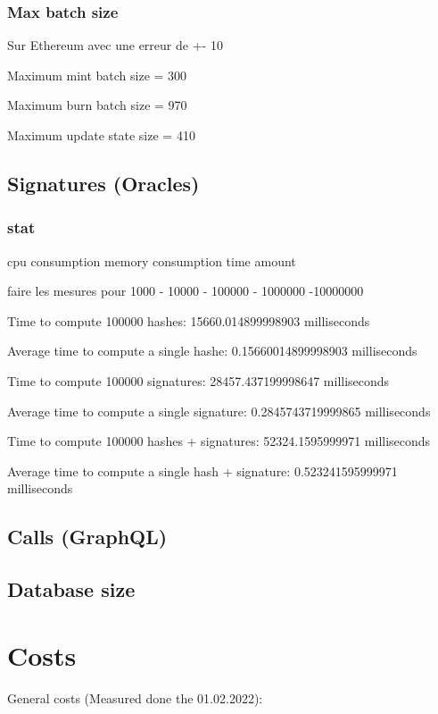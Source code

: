\documentclass[a4paper,11pt,oneside]{report}
\begin{document}
\subsubsection{Max batch size}
Sur Ethereum avec une erreur de +- 10 

Maximum mint batch size = 300 

Maximum burn batch size = 970

Maximum update state size = 410

\subsection{Signatures (Oracles)}

\subsubsection{stat}
cpu consumption
memory consumption
time amount



faire les mesures pour 1000 - 10000 - 100000 - 1000000 -10000000



Time to compute 100000 hashes: 15660.014899998903 milliseconds

Average time to compute a single hashe: 0.15660014899998903 milliseconds

Time to compute 100000 signatures: 28457.437199998647 milliseconds

Average time to compute a single signature: 0.2845743719999865 milliseconds

Time to compute 100000 hashes + signatures: 52324.1595999971 milliseconds

Average time to compute a single hash + signature: 0.523241595999971 milliseconds

\subsection{Calls (GraphQL)}

\subsection{Database size}

\section{Costs}
General costs (Measured done the 01.02.2022):
\end{document}
